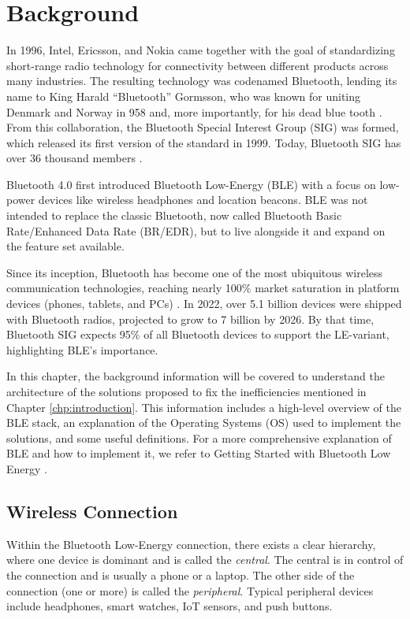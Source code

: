 \chapter{Background}
\label{chp:chapter_2}
In 1996, Intel, Ericsson, and Nokia came together with the goal of standardizing short-range radio technology for connectivity between different products across many industries. The resulting technology was codenamed Bluetooth, lending its name to King Harald ``Bluetooth'' Gormsson, who was known for uniting Denmark and Norway in 958 and, more importantly, for his dead blue tooth \cite{bluetooth_sig_name}. From this collaboration, the Bluetooth Special Interest Group (SIG) was formed, which released its first version of the standard in 1999. Today, Bluetooth SIG has over 36 thousand members \cite{bluetooth_sig_us}.

Bluetooth 4.0 first introduced Bluetooth Low-Energy (BLE) with a focus on low-power devices like wireless headphones and location beacons. BLE was not intended to replace the classic Bluetooth, now called Bluetooth Basic Rate/Enhanced Data Rate (BR/EDR), but to live alongside it and expand on the feature set available.

Since its inception, Bluetooth has become one of the most ubiquitous wireless communication technologies, reaching nearly 100\% market saturation in platform devices (phones, tablets, and PCs) \cite{bluetooth_market_update_2022}. In 2022, over 5.1 billion devices were shipped with Bluetooth radios, projected to grow to 7 billion by 2026. By that time, Bluetooth SIG expects 95\% of all Bluetooth devices to support the LE-variant, highlighting BLE's importance.

In this chapter, the background information will be covered to understand the architecture of the solutions proposed to fix the inefficiencies mentioned in Chapter \ref{chp:introduction}. This information includes a high-level overview of the BLE stack, an explanation of the Operating Systems (OS) used to implement the solutions, and some useful definitions. For a more comprehensive explanation of BLE and how to implement it, we refer to Getting Started with Bluetooth Low Energy \cite{townsend_cufi}.

\section{Wireless Connection}
\label{sec:ch2_wireless_connection}
Within the Bluetooth Low-Energy connection, there exists a clear hierarchy, where one device is dominant and is called the \textit{central}. The central is in control of the connection and is usually a phone or a laptop. The other side of the connection (one or more) is called the \textit{peripheral}. Typical peripheral devices include headphones, smart watches, IoT sensors, and push buttons. 

